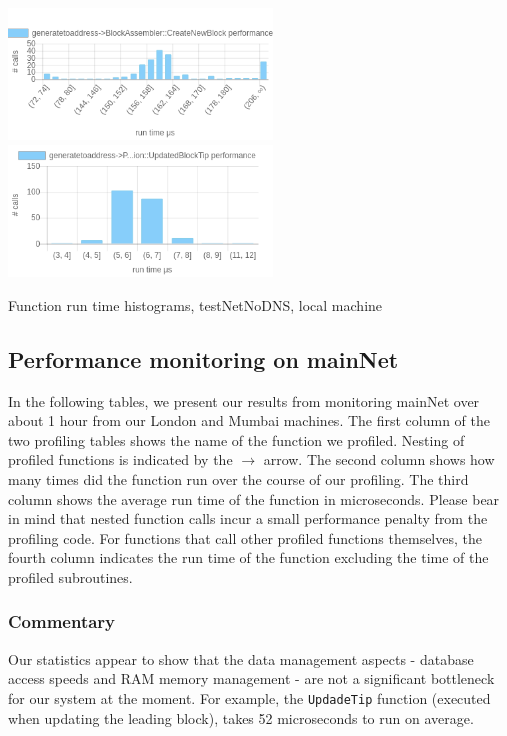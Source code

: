 \documentclass{article}
\begin{document}
\begin{table}
	\includegraphics[width=7cm]{images/local/chartgeneratetoaddress-_3EBlockAssembler_3A_3ACreateNewBlock.png}
	\includegraphics[width=7cm]{images/local/chartgeneratetoaddress-_3EPeerLogicValidation_3A_3AUpdatedBlockTip.png}
	
	
	\caption{Function run time histograms, testNetNoDNS, local machine}
\end{table}

\subsection{Performance monitoring on mainNet}
In the following tables, we present our results from monitoring mainNet over about 1 hour from our London and Mumbai machines. The first column of the two profiling tables shows the name of the function we profiled. Nesting of profiled functions is indicated by the $ \to $ arrow. The second column shows how many times did the function run over the course of our profiling. The third column shows the average run time of the function in microseconds. Please bear in mind that nested function calls incur a small performance penalty from the profiling code. For functions that call other profiled functions themselves, the fourth column indicates the run time of the function excluding the time of the profiled subroutines.


\subsubsection{Commentary}
Our statistics appear to show that the data management aspects - database access speeds and RAM memory management - are not a significant bottleneck for our system at the moment. For example, the \verb|UpdadeTip| function (executed when updating the leading block), takes 52 microseconds to run on average.
\end{document}
